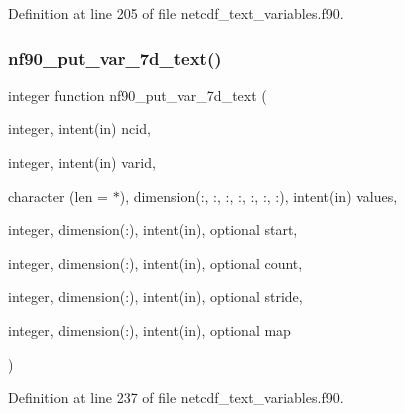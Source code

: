 Definition at line 205 of file netcdf\+\_\+text\+\_\+variables.\+f90.

\mbox{\label{netcdf__text__variables_8f90_a0cb3056fbb252e562bc9601f86162b93}} 
\subsubsection{\texorpdfstring{nf90\+\_\+put\+\_\+var\+\_\+7d\+\_\+text()}{nf90\_put\_var\_7d\_text()}}
{\footnotesize\ttfamily integer function nf90\+\_\+put\+\_\+var\+\_\+7d\+\_\+text (\begin{DoxyParamCaption}\item[{integer, intent(in)}]{ncid,  }\item[{integer, intent(in)}]{varid,  }\item[{character (len = $\ast$), dimension(\+:, \+:, \+:, \+:, \+:, \+:, \+:), intent(in)}]{values,  }\item[{integer, dimension(\+:), intent(in), optional}]{start,  }\item[{integer, dimension(\+:), intent(in), optional}]{count,  }\item[{integer, dimension(\+:), intent(in), optional}]{stride,  }\item[{integer, dimension(\+:), intent(in), optional}]{map }\end{DoxyParamCaption})}



Definition at line 237 of file netcdf\+\_\+text\+\_\+variables.\+f90.

\mbox{\label{netcdf__text__variables_8f90_a3c866ab5a35489ce0d9797838aec5b2c}} 
